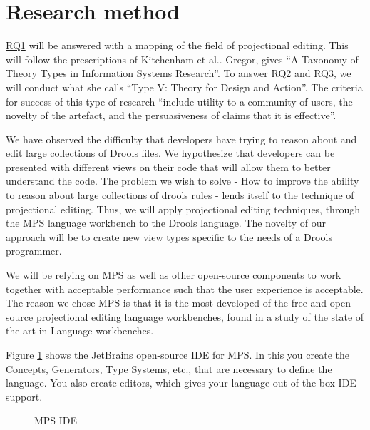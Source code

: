 \section{Research method} 

\hyperref[RQ1]{RQ1} will be answered with a mapping of the field of projectional editing. 
This will follow the prescriptions of Kitchenham et al.\cite{kitchenham2015evidence}.
Gregor\cite{gregor2006nature}, gives “A Taxonomy of Theory Types in Information Systems Research”. 
To answer \hyperref[RQ2]{RQ2} and \hyperref[RQ3]{RQ3}, we will conduct what she calls “Type V: Theory for Design and Action”. 
The criteria for success of this type of research “include utility to a community of users, the novelty of the artefact, and the persuasiveness of claims that it is effective”.

We have observed the difficulty that developers have trying to reason about and edit large collections of Drools files.
We hypothesize that developers can be presented with different views on their code that will allow them to better understand the code.
The problem we wish to solve - How to improve the ability to reason about large collections of drools rules - lends itself to the technique of projectional editing.
Thus, we will apply projectional editing techniques, through the MPS language workbench to the Drools language.
The novelty of our approach will be to create new view types specific to the needs of a Drools programmer.

We will be relying on MPS as well as other open-source components to work together with acceptable performance such that the user experience is acceptable.
The reason we chose MPS is that it is the most developed of the free and open source projectional editing language workbenches, found in a study of the state of the art in Language workbenches\cite{erdweg2013state}.

Figure \ref{fig:MPS_IDE} shows the JetBrains open-source IDE for MPS. 
In this you create the Concepts, Generators, Type Systems, etc., that are necessary to define the language.
You also create editors, which gives your language out of the box IDE support.

\begin{figure}[H]
    \centering
    \caption{MPS IDE}
    \label{fig:MPS_IDE}
\end{figure}

